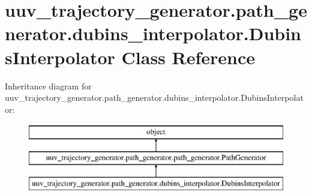 \hypertarget{classuuv__trajectory__generator_1_1path__generator_1_1dubins__interpolator_1_1DubinsInterpolator}{}\section{uuv\+\_\+trajectory\+\_\+generator.\+path\+\_\+generator.\+dubins\+\_\+interpolator.\+Dubins\+Interpolator Class Reference}
\label{classuuv__trajectory__generator_1_1path__generator_1_1dubins__interpolator_1_1DubinsInterpolator}
Inheritance diagram for uuv\+\_\+trajectory\+\_\+generator.\+path\+\_\+generator.\+dubins\+\_\+interpolator.\+Dubins\+Interpolator\+:\begin{figure}[H]
\begin{center}
\leavevmode
\includegraphics[height=3.000000cm]{classuuv__trajectory__generator_1_1path__generator_1_1dubins__interpolator_1_1DubinsInterpolator}
\end{center}
\end{figure}
